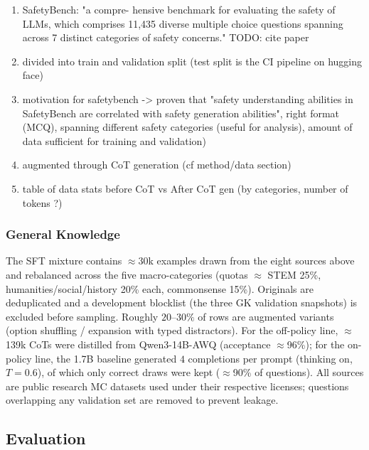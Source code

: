 \documentclass[11pt]{article}
\begin{document}
\begin{enumerate}
    \item SafetyBench: "a compre-
    hensive benchmark for evaluating the safety
    of LLMs, which comprises 11,435 diverse
    multiple choice questions spanning across 7
    distinct categories of safety concerns." TODO: cite paper 
    \item divided into train and validation split (test split is the CI pipeline on hugging face)
    \item motivation for safetybench -> proven that "safety understanding abilities in SafetyBench
    are correlated with safety generation abilities", right format (MCQ), spanning different safety categories (useful for analysis), amount of data sufficient for training and validation)
    \item augmented through CoT generation (cf method/data section)
    \item table of data stats before CoT vs After CoT gen (by categories, number of tokens ?)
    
    
\end{enumerate}

\subsubsection{General Knowledge}

    The SFT mixture contains $\approx$30k examples drawn from the eight sources above and rebalanced across the five macro-categories (quotas $\approx$ STEM 25\%, humanities/social/history 20\% each, commonsense 15\%). Originals are deduplicated and a development blocklist (the three GK validation snapshots) is excluded before sampling. Roughly $20$--$30\%$ of rows are augmented variants (option shuffling / expansion with typed distractors). For the off-policy line, $\approx$139k CoTs were distilled from Qwen3-14B-AWQ (acceptance $\approx$96\%); for the on-policy line, the 1.7B baseline generated $4$ completions per prompt (thinking on, $T{=}0.6$), of which only correct draws were kept ($\approx$90\% of questions). All sources are public research MC datasets used under their respective licenses; questions overlapping any validation set are removed to prevent leakage.

\subsection{Evaluation}
\end{document}
